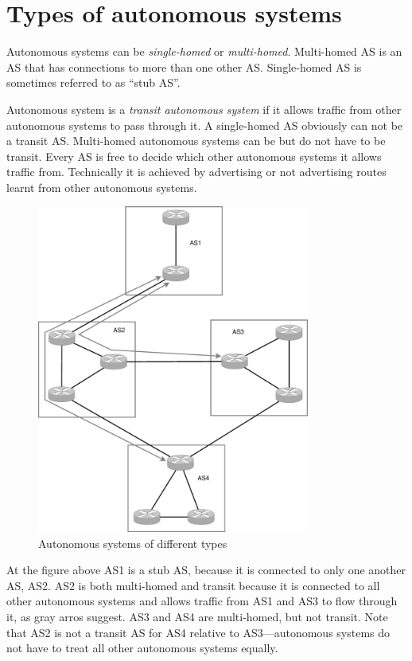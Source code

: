 \section{Types of autonomous systems}

Autonomous systems can be \emph{single-homed} or \emph{multi-homed}. Multi-homed AS is an AS that has connections to more than
one other AS. Single-homed AS is sometimes referred to as ``stub AS''.

Autonomous system is a \emph{transit autonomous system} if it allows traffic from other autonomous systems to pass through it.
A single-homed AS obviously can not be a transit AS. Multi-homed autonomous systems can be but do not have to be transit.
Every AS is free to decide which other autonomous systems it allows traffic from. Technically it is achieved by advertising
or not advertising routes learnt from other autonomous systems.

\begin{figure}[t]
    \centering
    \includegraphics[width=0.8\textwidth]{graphics/as_types.eps}
    \caption{Autonomous systems of different types}
    \label{fig:as_types}
\end{figure}

At the figure above AS1 is a stub AS, because it is connected to only one another AS, AS2. AS2 is both multi-homed
and transit because it is connected to all other autonomous systems and allows traffic from AS1 and AS3 to flow through it,
as gray arros suggest. AS3 and AS4 are multi-homed, but not transit. Note that AS2 is not a transit AS for AS4 relative to
AS3---autonomous systems do not have to treat all other autonomous systems equally.

